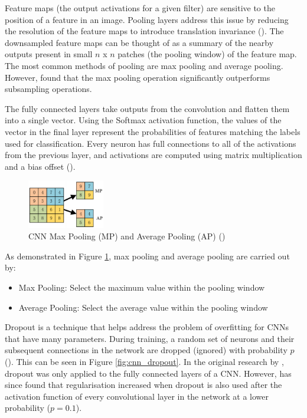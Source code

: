 Feature maps (the output activations for a given filter) are sensitive to the position of a feature in an image. Pooling layers address this issue by reducing the resolution of the feature maps to introduce translation invariance (\cite{scherer_evaluation_2010}). The downsampled feature maps can be thought of as a summary of the nearby outputs present in small $n$ x $n$ patches (the pooling window) of the feature map. The most common methods of pooling are max pooling and average pooling. However, \cite{scherer_evaluation_2010} found that the max pooling operation significantly outperforms subsampling operations.

The fully connected layers take outputs from the convolution and flatten them into a single vector. Using the Softmax activation function, the values of the vector in the final layer represent the probabilities of features matching the labels used for classification. Every neuron has full connections to all of the activations from the previous layer, and activations are computed using matrix multiplication and a bias offset (\cite{stanford_cs231n_2019}).

\begin{figure}[ht!]
\centering
\includegraphics[width=0.30\textwidth]{media/literature/machine_learning/ml_pooling.png}
\caption[Diagram of CNN Max Pooling and Average Pooling ]{\acrshort{CNN} Max Pooling (MP) and Average Pooling (AP) (\cite{wang_pooling_2018})}
\label{fig:cnn_pooling}
\end{figure}

As demonstrated in Figure \ref{fig:cnn_pooling}, max pooling and average pooling are carried out by:

\begin{itemize}
    \item Max Pooling: Select the maximum value within the pooling window
    \item Average Pooling: Select the average value within the pooling window
\end{itemize}

Dropout is a technique that helps address the problem of overfitting for \acrshort{CNN}s that have many parameters. During training, a random set of neurons and their subsequent connections in the network are dropped (ignored) with probability $p$ (\cite{srivastava_dropout_2014}). This can be seen in Figure \ref{fig:cnn_dropout}. In the original research by \cite{hinton_dropout_2012}, dropout was only applied to the fully connected layers of a \acrshort{CNN}. However, \cite{lai_dropout_2017} has since found that regularisation increased when dropout is also used after the activation function of every convolutional layer in the network at a lower probability ($p = 0.1$).

